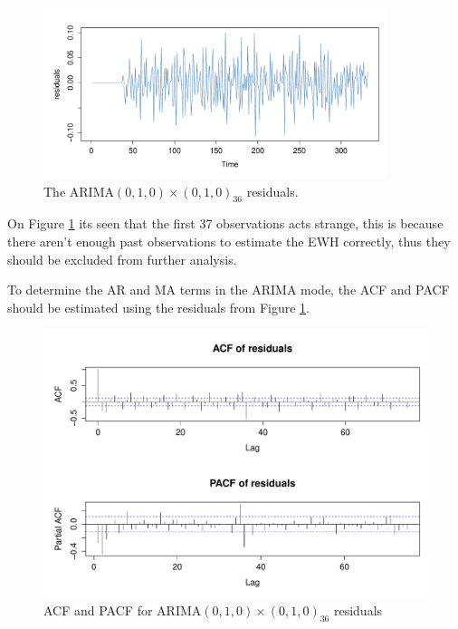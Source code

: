 \begin{figure}[H]
\centering
\includegraphics[height=5cm]{figures/ts-residual-i1s1}
\caption{The ARIMA$(0,1,0) \times (0,1,0)_{36}$ residuals.}
\label{fig:ts-residual-i1s1}
\end{figure}
On Figure \ref{fig:ts-residual-i1s1} its seen that the first 37 observations acts strange, this is because there aren't enough past observations to estimate the EWH correctly, thus they should be excluded from further analysis.

To determine the AR and MA terms in the ARIMA mode, the ACF and PACF should be estimated using the residuals from Figure \ref{fig:ts-residual-i1s1}.
\begin{figure}[H]
	\centering
	\includegraphics[width=\textwidth]{figures/ts-acf-ar0s0}
	\caption{ACF and PACF for ARIMA$(0,1,0) \times (0,1,0)_{36}$ residuals}
	\label{fig:ts-acf-ar0s0}
\end{figure}

